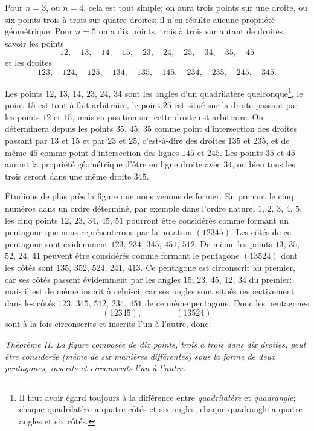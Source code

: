 \documentclass[11pt,a4paper]{book}
\begin{document}
Pour $n = 3$, ou $n = 4$, cela est tout simple; on aura trois points sur une droite, ou six points trois \`a trois sur quatre droites; il n'en r\'esulte aucune propri\'et\'e g\'eom\'etrique. Pour $n = 5$ on a dix points, trois \`a trois sur autant de droites, savoir les points
\[
12,\quad 13,\quad 14,\quad 15,\quad 23,\quad 24,\quad 25,\quad 34,\quad 35,\quad 45
\]
et les droites
\[
123,\quad 124,\quad 125,\quad 134,\quad 135,\quad 145,\quad 234,\quad 235,\quad 245,\quad 345.
\]

Les points $12$, $13$, $14$, $23$, $24$, $34$ sont les angles d'un quadrilat\`ere quelconque\footnote{Il faut avoir \'egard toujours \`a la diff\'erence entre \textit{quadrilat\`ere} et \textit{quadrangle}; chaque quadrilat\`ere a quatre c\^ot\'es et six angles, chaque quadrangle a quatre angles et six c\^ot\'es.}, le point $15$ est tout \`a fait arbitraire, le point $25$ est situ\'e sur la droite passant par les points $12$ et $15$, mais sa position sur cette droite est arbitraire. On d\'eterminera depuis les points $35$, $45$; $35$ comme point d'intersection des droites passant par $13$ et $15$ et par $23$ et $25$, c'est-\`a-dire des droites $135$ et $235$, et de m\^eme $45$ comme point d'intersection des lignes $145$ et $245$. Les points $35$ et $45$ auront la propri\'et\'e g\'eom\'etrique d'\^etre en ligne droite avec $34$, ou bien tous les trois seront dans une m\^eme droite $345$.

\'Etudions de plus pr\`es la figure que nous venons de former. En prenant le cinq num\'eros dans un ordre d\'etermin\'e, par exemple dans l'ordre naturel $1$, $2$, $3$, $4$, $5$, les cinq points $12$, $23$, $34$, $45$, $51$ pourront \^etre consid\'er\'es comme formant un pentagone que nous repr\'esenterons par la notation $(12345)$. Les c\^ot\'es de ce pentagone sont \'evidemment $123$, $234$, $345$, $451$, $512$. De m\^eme les points $13$, $35$, $52$, $24$, $41$ peuvent \^etre consid\'er\'es comme formant le pentagone $(13524)$ dont les c\^ot\'es sont $135$, $352$, $524$, $241$, $413$. Ce pentagone est circonscrit au premier, car ses c\^ot\'es passent \'evidemment par les angles $15$, $23$, $45$, $12$, $34$ du premier: mais il est de m\^eme inscrit \`a celui-ci, car ses angles sont situ\'es respectivement dans les c\^ot\'es $123$, $345$, $512$, $234$, $451$ de ce m\^eme pentagone. Donc les pentagones
\[
(12345),\qquad\qquad (13524)
\]
sont \`a la fois circonscrits et inscrits l'un \`a l'autre, donc:

\smallskip
\textit{Th\'eor\`eme II. La figure compos\'ee de dix points, trois \`a trois dans dix droites, peut \^etre consid\'er\'ee (m\^eme de six mani\`eres diff\'erentes) sous la forme de deux pentagones, inscrits et circonscrits l'un \`a l'autre.}
\smallskip
\end{document}
